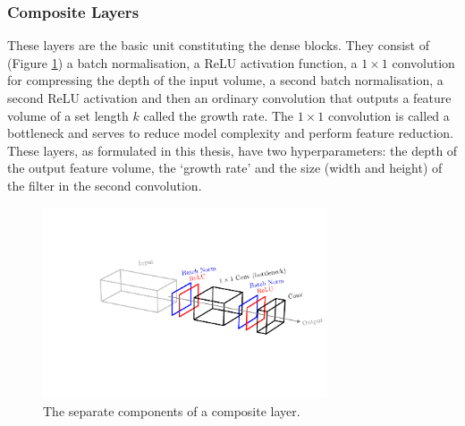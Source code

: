 \subsubsection{Composite Layers}
These layers are the basic unit constituting the dense blocks. They consist of (Figure \ref{fig:machine_learning:composite_layer}) a batch normalisation, a ReLU activation function, a $1\times{}1$ convolution for compressing the depth of the input volume, a second batch normalisation, a second ReLU activation and then an ordinary convolution that outputs a feature volume of a set length $k$ called the growth rate. The $1\times{}1$ convolution is called a bottleneck and serves to reduce model complexity and perform feature reduction. These layers, as formulated in this thesis, have two hyperparameters: the depth of the output feature volume, the `growth rate' and the size (width and height) of the filter in the second convolution. 
\begin{figure}[h!]
    \centering
    \includegraphics[width=0.75\textwidth]{figures/machine_learning/composite_layer.pdf}
    \caption{The separate components of a composite layer.}
        \label{fig:machine_learning:composite_layer}
\end{figure}


